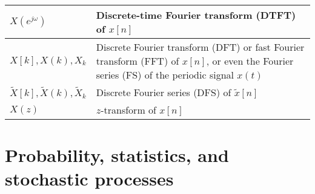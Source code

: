 \documentclass{article}
\begin{document}
\begin{xltabular}{\textwidth}{XX}
	\(X(e^{j\omega})\)                                                                                                      & Discrete-time Fourier transform (DTFT) of \(x[n]\)                                                                                            \\ \hline
	\(X[k], X(k), X_k\)                                                                                                     & Discrete Fourier transform (DFT) or fast Fourier transform (FFT) of \(x[n]\), or even the Fourier series (FS) of the periodic signal \(x(t)\) \\ \hline
	\(\tilde{X}[k], \tilde{X}(k), \tilde{X}_k\)                                                                             & Discrete Fourier series (DFS) of \(\tilde{x}[n]\)                                                                                             \\ \hline
	\(X(z)\)                                                                                                                & \(z\)-transform of \(x[n]\)                                                                                                                   \\
\end{xltabular}

\section{Probability, statistics, and stochastic processes}
\end{document}
